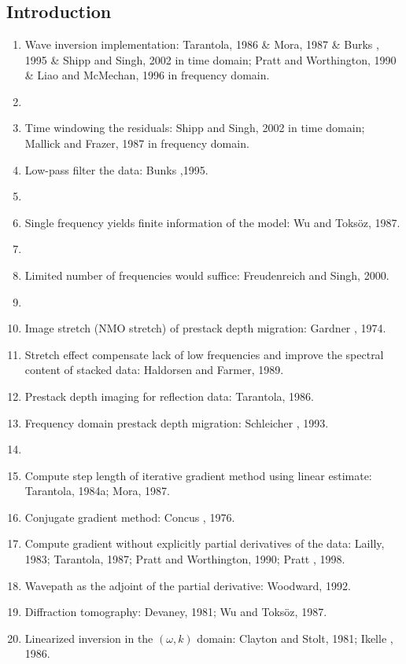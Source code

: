 \renewcommand{\pmk}{Sirgue\_2004\_Geophy\_Temporal frequencies selecting}
\renewcommand{\prf}{FWI/\pmk.pdf}
\renewcommand{\pti}{Efficient waveform inversion and imaging:
A strategy for selecting temporal frequencies}
\renewcommand{\pay}{Laurent Sirgue and R. Gerhard Pratt, 2004}
\renewcommand{\pjo}{Geophysics}
\renewcommand{\pda}{2016/9/23 Fri.}

\section{\pinfo}
\subsection{Introduction}
\begin{enumerate}[\hspace{10mm}*]
  \item Wave inversion implementation: Tarantola, 1986 \& Mora, 1987
    \& Burks \etal, 1995 \& Shipp and Singh, 2002 in time domain;
    Pratt and Worthington, 1990 \& Liao and McMechan, 1996 in frequency domain.
  \item \sline
  \item Time windowing the residuals: Shipp and Singh, 2002 in time domain;
    Mallick and Frazer, 1987 in frequency domain.
  \item Low-pass filter the data: Bunks \etal,1995.
  \item \sline
  \item Single frequency yields finite information of the model: Wu and Toks\"{o}z, 1987.
  \item \sline
  \item Limited number of frequencies would suffice: Freudenreich and Singh, 2000.
  \item \sline
  \item Image stretch (NMO stretch) of prestack depth migration: Gardner \etal, 1974.
  \item Stretch effect compensate lack of low frequencies
    and improve the spectral content of stacked data: Haldorsen and Farmer, 1989.
  \item Prestack depth imaging for reflection data: Tarantola, 1986.
  \item Frequency domain prestack depth migration: Schleicher \etal, 1993.
  \item \sline
  \item Compute step length of iterative gradient method using linear estimate:
    Tarantola, 1984a; Mora, 1987.
  \item Conjugate gradient method: Concus \etal, 1976.
  \item Compute gradient without explicitly partial derivatives of the data:
    Lailly, 1983; Tarantola, 1987; Pratt and Worthington, 1990; Pratt \etal, 1998.
  \item Wavepath as the adjoint of the \Frechet partial derivative: Woodward, 1992.
  \item Diffraction tomography: Devaney, 1981; Wu and Toks\"{o}z, 1987.
  \item Linearized inversion in the $(\omega,k)$ domain:
  Clayton and Stolt, 1981; Ikelle \etal, 1986.
\end{enumerate}

